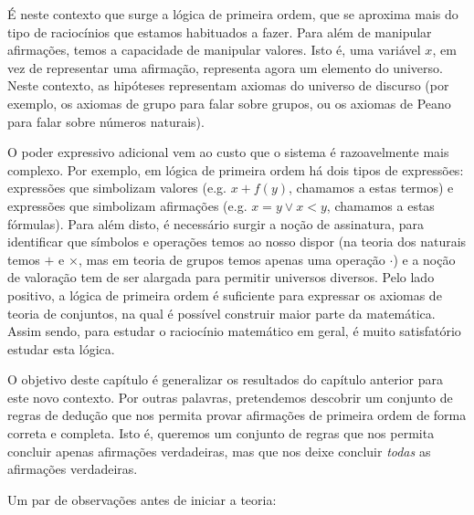 \documentclass{report}
\theoremstyle{definition}
\theoremstyle{remark}
\begin{document}
	É neste contexto que surge a lógica de primeira ordem, que se aproxima mais do tipo de raciocínios que estamos habituados a fazer. Para além de manipular afirmações, temos a capacidade de manipular valores. Isto é, uma variável $x$, em vez de representar uma afirmação, representa agora um elemento do universo. Neste contexto, as hipóteses representam axiomas do universo de discurso (por exemplo, os axiomas de grupo para falar sobre grupos, ou os axiomas de Peano para falar sobre números naturais).
	
	O poder expressivo adicional vem ao custo que o sistema é razoavelmente mais complexo. Por exemplo, em lógica de primeira ordem há dois tipos de expressões: expressões que simbolizam valores (e.g. $x + f(y)$, chamamos a estas termos) e expressões que simbolizam afirmações (e.g. $x = y \lor x < y$, chamamos a estas fórmulas). Para além disto, é necessário surgir a noção de assinatura, para identificar que símbolos e operações temos ao nosso dispor (na teoria dos naturais temos $+$ e $\times$, mas em teoria de grupos temos apenas uma operação $\cdot$) e a noção de valoração tem de ser alargada para permitir universos diversos. Pelo lado positivo, a lógica de primeira ordem é suficiente para expressar os axiomas de teoria de conjuntos, na qual é possível construir maior parte da matemática. Assim sendo, para estudar o raciocínio matemático em geral, é muito satisfatório estudar esta lógica.
	
	O objetivo deste capítulo é generalizar os resultados do capítulo anterior para este novo contexto. Por outras palavras, pretendemos descobrir um conjunto de regras de dedução que nos permita provar afirmações de primeira ordem de forma correta e completa. Isto é, queremos um conjunto de regras que nos permita concluir apenas afirmações verdadeiras, mas que nos deixe concluir \emph{todas} as afirmações verdadeiras.
	
	Um par de observações antes de iniciar a teoria:
	
\end{document}
